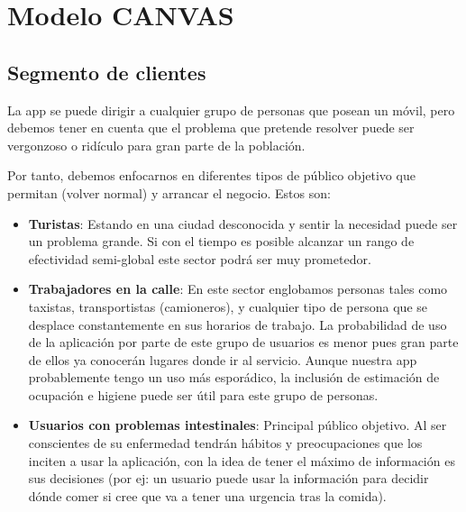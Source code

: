 \section{Modelo CANVAS}




\subsection{Segmento de clientes}


La app se puede dirigir a cualquier grupo de personas que posean un móvil, pero debemos tener en cuenta que el problema que pretende resolver puede ser vergonzoso o ridículo para gran parte de la población.

Por tanto, debemos enfocarnos en diferentes tipos de público objetivo que permitan (volver normal) y arrancar el negocio. Estos son:
\begin{itemize}
    \item \textbf{Turistas}: Estando en una ciudad desconocida y sentir la necesidad puede ser un problema grande. Si con el tiempo es posible alcanzar un rango de efectividad semi-global este sector podrá ser muy prometedor.
    \item \textbf{Trabajadores en la calle}: En este sector englobamos personas tales como taxistas, transportistas (camioneros), y cualquier tipo de persona que se desplace constantemente en sus horarios de trabajo. La probabilidad de uso de la aplicación por parte de este grupo de usuarios es menor pues gran parte de ellos ya conocerán lugares donde ir al servicio. Aunque nuestra app probablemente tengo un uso más esporádico, la inclusión de estimación de ocupación e higiene puede ser útil para este grupo de personas.
    \item \textbf{Usuarios con problemas intestinales}: Principal público objetivo. Al ser conscientes de su enfermedad tendrán hábitos y preocupaciones que los inciten a usar la aplicación, con la idea de tener el máximo de información es sus decisiones (por ej: un usuario puede usar la información para decidir dónde comer si cree que va a tener una urgencia tras la comida).
\end{itemize}

